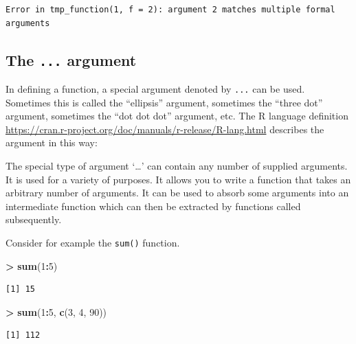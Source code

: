 \documentclass[]{krantz}
\makeatletter
\newenvironment{Shaded}{\begin{snugshade}}{\end{snugshade}}
\newcommand{\DecValTok}[1]{\textcolor[rgb]{0.06,0.06,0.06}{#1}}
\newcommand{\KeywordTok}[1]{\textcolor[rgb]{0.27,0.27,0.27}{\textbf{#1}}}
\newcommand{\NormalTok}[1]{#1}
\newcommand{\OperatorTok}[1]{\textcolor[rgb]{0.43,0.43,0.43}{\textbf{#1}}}
\newcommand{\StringTok}[1]{\textcolor[rgb]{0.5,0.5,0.5}{#1}}
\renewenvironment{quote}{\begin{VF}}{\end{VF}}
\newenvironment{kframe}{%
\medskip{}
\setlength{\fboxsep}{.8em}
 \def\at@end@of@kframe{}%
 \ifinner\ifhmode%
  \def\at@end@of@kframe{\end{minipage}}%
  \begin{minipage}{\columnwidth}%
 \fi\fi%
 \def\FrameCommand##1{\hskip\@totalleftmargin \hskip-\fboxsep
 \colorbox{shadecolor}{##1}\hskip-\fboxsep
     \hskip-\linewidth \hskip-\@totalleftmargin \hskip\columnwidth}%
 \MakeFramed {\advance\hsize-\width
   \@totalleftmargin\z@ \linewidth\hsize
   \@setminipage}}%
 {\par\unskip\endMakeFramed%
 \at@end@of@kframe}
\renewenvironment{Shaded}{\begin{kframe}}{\end{kframe}}
\makeatother
\begin{document}
\begin{verbatim}
Error in tmp_function(1, f = 2): argument 2 matches multiple formal arguments
\end{verbatim}

\hypertarget{the-...-argument}{%
\subsection{\texorpdfstring{The \texttt{...} argument}{The ... argument}}\label{the-...-argument}}

In defining a function, a special argument denoted by \texttt{...} can be used. Sometimes this is called the ``ellipsis'' argument, sometimes the ``three dot'' argument, sometimes the ``dot dot dot'' argument, etc. The R language definition \url{https://cran.r-project.org/doc/manuals/r-release/R-lang.html} describes the argument in this way:

\begin{quote}
The special type of argument `\ldots{}' can contain any number of supplied arguments. It is used for a variety of purposes. It allows you to write a function that takes an arbitrary number of arguments. It can be used to absorb some arguments into an intermediate function which can then be extracted by functions called subsequently.
\end{quote}

Consider for example the \texttt{sum()} function.

\begin{Shaded}
\begin{Highlighting}[]
\OperatorTok{>}\StringTok{ }\KeywordTok{sum}\NormalTok{(}\DecValTok{1}\OperatorTok{:}\DecValTok{5}\NormalTok{)}
\end{Highlighting}
\end{Shaded}

\begin{verbatim}
[1] 15
\end{verbatim}

\begin{Shaded}
\begin{Highlighting}[]
\OperatorTok{>}\StringTok{ }\KeywordTok{sum}\NormalTok{(}\DecValTok{1}\OperatorTok{:}\DecValTok{5}\NormalTok{, }\KeywordTok{c}\NormalTok{(}\DecValTok{3}\NormalTok{, }\DecValTok{4}\NormalTok{, }\DecValTok{90}\NormalTok{))}
\end{Highlighting}
\end{Shaded}

\begin{verbatim}
[1] 112
\end{verbatim}
\end{document}
